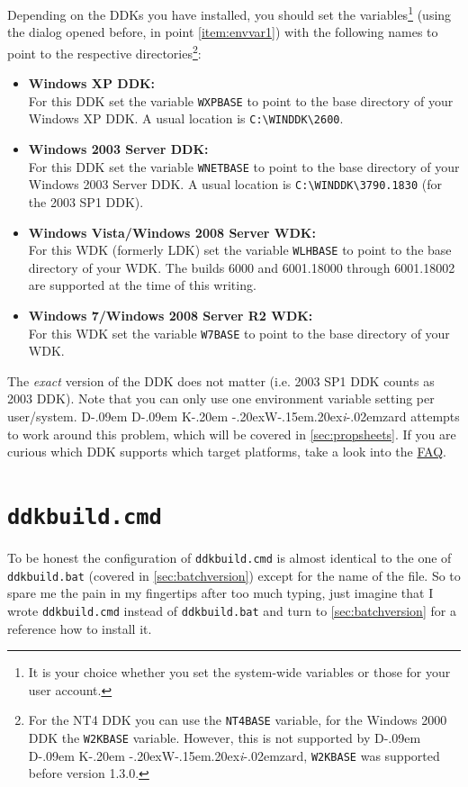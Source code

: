 \documentclass[a4paper,titlepage]{report}
\def\ddkwiz{\texorpdfstring{D\kern-.09em D\kern-.09em K\kern-.20em \raise-.20ex\hbox{W}\kern-.15em\raise.20ex\hbox{\it{i}}\kern-.02em{zard}}{DDKWizard}}
\begin{document}
\begin{enumerate}
    Depending on the DDKs you have installed, you should set the variables\footnote{It is your
    choice whether you set the system-wide variables or those for your user account.} (using
    the dialog opened before, in point \ref{item:envvar1}) with the following names to point to the
    respective directories\footnote{For the NT4 DDK you can use the \texttt{NT4BASE} variable, for
    the Windows 2000 DDK the \texttt{W2KBASE} variable.
    However, this is not supported by \ddkwiz{}, \texttt{W2KBASE} was supported before version 1.3.0.}:
    \begin{itemize}
        \item
          \textbf{Windows XP DDK:}\\
            For this DDK set the variable \texttt{WXPBASE} to point to the base directory of your
            Windows XP DDK. A usual location is \verb+C:\WINDDK\2600+.
        \item
          \textbf{Windows 2003 Server DDK:}\\
            For this DDK set the variable \texttt{WNETBASE} to point to the base directory of your
            Windows 2003 Server DDK. A usual location is \verb+C:\WINDDK\3790.1830+
            (for the 2003 SP1 DDK).
        \item
          \textbf{Windows Vista/Windows 2008 Server WDK:}\\
            For this WDK (formerly LDK) set the variable \texttt{WLHBASE} to point to the base
            directory of your WDK. The builds 6000 and 6001.18000 through 6001.18002 are supported
            at the time of this writing.
        \item
          \textbf{Windows 7/Windows 2008 Server R2 WDK:}\\
            For this WDK set the variable \texttt{W7BASE} to point to the base directory of your
            WDK.
    \end{itemize}
    The \emph{exact} version of the DDK does not matter (i.e. 2003 SP1 DDK counts as 2003 DDK).
    Note that you can only use one environment variable setting per user/system. \ddkwiz{}
    attempts to work around this problem, which will be covered in \autoref{sec:propsheets}.
    If you are curious which DDK supports which target platforms, take a look into the
    \hyperref[cha:faq]{FAQ}.
\end{enumerate}
\section{\texttt{ddkbuild.cmd}}
\label{sec:ntscriptversion}
To be honest the configuration of \texttt{ddkbuild.cmd} is almost identical to the one of
\texttt{ddkbuild.bat} (covered in \autoref{sec:batchversion}) except for the name of the file.
So to spare me the pain in my fingertips after too much typing, just imagine that I
wrote \texttt{ddkbuild.cmd} instead of \texttt{ddkbuild.bat} and turn to \autoref{sec:batchversion}
for a reference how to install it.
\end{document}
